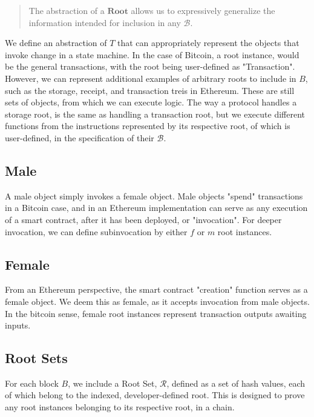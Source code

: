 \documentclass[12pt, titlepage, twocolumn]{report}
\begin{document}
\begin{quotation}
  The abstraction of a \(\boldsymbol{Root}\) allows us to expressively generalize the information intended for inclusion in any \(\boldsymbol{\mathcal{B}}\).
 \end{quotation}

We define an abstraction of \(T\) that can appropriately represent the objects that invoke change in a state machine. In the case of Bitcoin, a root instance, would be the general transactions, with the root being user-defined as "Transaction". However, we can represent additional examples of arbitrary roots to include in \(B\), such as the storage, receipt, and transaction treis in Ethereum. These are still sets of objects, from which we can execute logic. The way a protocol handles a storage root, is the same as handling a transaction root, but we execute different functions from the instructions represented by its respective root, of which is user-defined, in the specification of their \(\boldsymbol{\mathcal{B}}\).


\subsection{Male}
A male object simply invokes a female object. Male objects "spend" transactions in a Bitcoin case, and in an Ethereum implementation can serve as any execution of a smart contract, after it has been deployed, or "invocation". For deeper invocation, we can define subinvocation by either \(f\) or \(m\) root instances.

\subsection{Female}
From an Ethereum perspective, the smart contract "creation" function serves as a female object. We deem this as female, as it accepts invocation from male objects. In the bitcoin sense, female root instances represent transaction outputs awaiting inputs. 


\subsection{Root Sets}


For each block \(B\),  we include a Root Set, \(\mathcal{R}\), defined as a set of hash values, each of which belong to the indexed, developer-defined root. This is designed to prove any root instances belonging to its respective root, in a chain.
\end{document}
